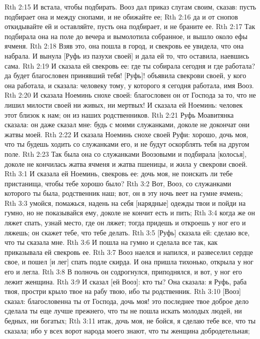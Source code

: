 Rth 2:15  И встала, чтобы подбирать. Вооз дал приказ слугам своим, сказав: пусть подбирает она и между снопами, и не обижайте ее;
Rth 2:16  да и от снопов откидывайте ей и оставляйте, пусть она подбирает, и не браните ее.
Rth 2:17  Так подбирала она на поле до вечера и вымолотила собранное, и вышло около ефы ячменя.
Rth 2:18  Взяв это, она пошла в город, и свекровь ее увидела, что она набрала. И вынула [Руфь из пазухи своей] и дала ей то, что оставила, наевшись сама.
Rth 2:19  И сказала ей свекровь ее: где ты собирала сегодня и где работала? да будет благословен принявший тебя! [Руфь]! объявила свекрови своей, у кого она работала, и сказала: человеку тому, у которого я сегодня работала, имя Вооз.
Rth 2:20  И сказала Ноеминь снохе своей: благословен он от Господа за то, что не лишил милости своей ни живых, ни мертвых! И сказала ей Ноеминь: человек этот близок к нам; он из наших родственников.
Rth 2:21  Руфь Моавитянка сказала: он даже сказал мне: будь с моими служанками, доколе не докончат они жатвы моей.
Rth 2:22  И сказала Ноеминь снохе своей Руфи: хорошо, дочь моя, что ты будешь ходить со служанками его, и не будут оскорблять тебя на другом поле.
Rth 2:23  Так была она со служанками Воозовыми и подбирала [колосья], доколе не кончилась жатва ячменя и жатва пшеницы, и жила у свекрови своей.
Rth 3:1  И сказала ей Ноеминь, свекровь ее: дочь моя, не поискать ли тебе пристанища, чтобы тебе хорошо было?
Rth 3:2  Вот, Вооз, со служанками которого ты была, родственник наш; вот, он в эту ночь веет на гумне ячмень;
Rth 3:3  умойся, помажься, надень на себя [нарядные] одежды твои и пойди на гумно, но не показывайся ему, доколе не кончит есть и пить;
Rth 3:4  когда же он ляжет спать, узнай место, где он ляжет; тогда придешь и откроешь у ног его и ляжешь; он скажет тебе, что тебе делать.
Rth 3:5  [Руфь] сказала ей: сделаю все, что ты сказала мне.
Rth 3:6  И пошла на гумно и сделала все так, как приказывала ей свекровь ее.
Rth 3:7  Вооз наелся и напился, и развеселил сердце свое, и пошел [и лег] спать подле скирда. И она пришла тихонько, открыла у ног его и легла.
Rth 3:8  В полночь он содрогнулся, приподнялся, и вот, у ног его лежит женщина.
Rth 3:9  И сказал [ей Вооз]: кто ты? Она сказала: я Руфь, раба твоя, простри крыло твое на рабу твою, ибо ты родственник.
Rth 3:10  [Вооз] сказал: благословенна ты от Господа, дочь моя! это последнее твое доброе дело сделала ты еще лучше прежнего, что ты не пошла искать молодых людей, ни бедных, ни богатых;
Rth 3:11  итак, дочь моя, не бойся, я сделаю тебе все, что ты сказала; ибо у всех ворот народа моего знают, что ты женщина добродетельная;
